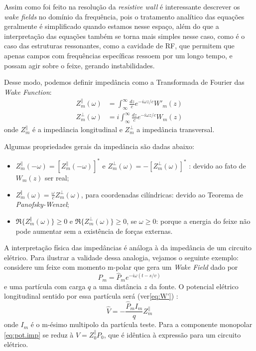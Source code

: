 Assim como foi feito na resolução da \textit{resistive wall} é interessante descrever os \textit{wake fields} no domínio da frequência, pois o tratamento analítico das equações geralmente é simplificado quando estamos nesse espaço, além do que a interpretação das equações também se torna mais simples nesse caso, como é o caso das estruturas ressonantes, como a cavidade de RF, que permitem que apenas campos com frequências específicas ressoem por um longo tempo, e possam agir sobre o feixe, gerando instabilidades.

Desse modo, podemos definir impedância como a Transformada de Fourier das
\textit{Wake Function}:
\begin{align}
Z^\lVert_m (\omega)&=\int^\infty_\infty\!\!\frac{dz}{c}e^{-i\omega z/c}W'_m(z)\\
Z^\perp_m (\omega)&= i\int^\infty_\infty \!\! \frac{dz}{c}e^{-i\omega z/c}W_m(z)
\end{align}
onde $Z^\lVert_m$ é a impedância longitudinal e $Z^\perp_m$ a impedância transversal.

Algumas propriedades gerais da impedância são dadas abaixo:
\begin{itemize}
 \item $Z_m^\lVert(-\omega) = [ Z_m^\lVert(-\omega)]^*$ e $Z_m^\perp(\omega) = - [Z_m^\perp(\omega)]^*$ : devido ao fato de $W_m(z)$ ser real;
\item $Z_m^\Vert(\omega) = \frac{\omega}{c}Z_m^\perp(\omega)$, para coordenadas cilíndricas: devido ao Teorema de \textit{Panofsky-Wenzel};
\item $\Re\{Z_m^\Vert(\omega)\}\geq 0$ e $\Re\{Z_m^\perp(\omega)\}\geq 0$, se $\omega\geq 0$: porque a energia do feixe não pode aumentar sem a existência de forças externas.
\end{itemize}

A interpretação física das impedâncias é análoga à da impedância de um circuito elétrico. Para ilustrar a validade dessa analogia, vejamos o seguinte exemplo: considere um feixe com momento m-polar que gera um \textit{Wake Field} dado por
\begin{equation}
 P_m = \hat{P}_m e^{-i\omega(t-s/v)} \nonumber
\end{equation}
e uma partícula com carga $q$ a uma distância $z$ da fonte. O potencial elétrico longitudinal sentido por essa partícula será (ver\eqref{eq:W'}) \cite{Bio}:
\begin{equation}\label{eq:pot.imp}
\hat{V} =-\frac{\hat{P}_m I_m}{q} Z_m^\lVert
\end{equation}
onde $I_m$ é o m-ésimo multipolo da partícula teste. Para a componente monopolar \eqref{eq:pot.imp} se reduz à $V = Z^\lVert_0 P_0$, que é idêntica à expressão para um circuito elétrico.

